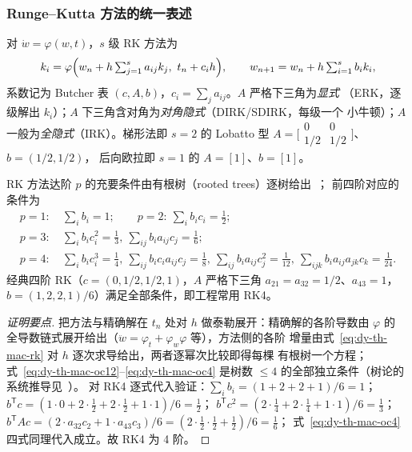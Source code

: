 \subsubsection{Runge--Kutta 方法的统一表述}

\begin{definition}\label{def:dy-th-mac-rk}
对 $\dot w=\varphi(w,t)$，$s$ 级 RK 方法为
\begin{equation}
k_i=\varphi\Bigl(w_n+h\textstyle\sum_{j=1}^{s}a_{ij}k_j,\ t_n+c_ih\Bigr),
\qquad
w_{n+1}=w_n+h\sum_{i=1}^{s}b_ik_i,
\label{eq:dy-th-mac-rk}
\end{equation}
系数记为 Butcher 表 $(c,A,b)$，$c_i=\sum_ja_{ij}$。$A$ 严格下三角为\emph{显式}
（ERK，逐级解出 $k_i$）；$A$ 下三角含对角为\emph{对角隐式}（DIRK/SDIRK，每级一个
小牛顿）；$A$ 一般为\emph{全隐式}（IRK）。梯形法即 $s=2$ 的 Lobatto 型
$A=\bigl[\begin{smallmatrix}0&0\\1/2&1/2\end{smallmatrix}\bigr]$、$b=(1/2,1/2)$，
后向欧拉即 $s=1$ 的 $A=[1]$、$b=[1]$。
\end{definition}

\begin{proposition}[阶条件（至 4 阶）]\label{prop:dy-th-mac-ordercond}
RK 方法达阶 $p$ 的充要条件由有根树（rooted trees）逐树给出~\cite{dym:butcher}；
前四阶对应的条件为
\begin{align}
p=1:&\ \textstyle\sum_ib_i=1;\qquad
p=2:\ \sum_ib_ic_i=\tfrac12;\label{eq:dy-th-mac-oc12}\\
p=3:&\ \textstyle\sum_ib_ic_i^2=\tfrac13,\ \sum_{ij}b_ia_{ij}c_j=\tfrac16;
\label{eq:dy-th-mac-oc3}\\
p=4:&\ \textstyle\sum_ib_ic_i^3=\tfrac14,\ \sum_{ij}b_ic_ia_{ij}c_j=\tfrac18,
\ \sum_{ij}b_ia_{ij}c_j^2=\tfrac1{12},\
\sum_{ijk}b_ia_{ij}a_{jk}c_k=\tfrac1{24}.
\label{eq:dy-th-mac-oc4}
\end{align}
经典四阶 RK（$c=(0,1/2,1/2,1)$，$A$ 严格下三角 $a_{21}=a_{32}=1/2$、$a_{43}=1$，
$b=(1,2,2,1)/6$）满足全部条件，即工程常用 RK4。
\end{proposition}

\begin{proof}[证明要点]
把方法与精确解在 $t_n$ 处对 $h$ 做泰勒展开：精确解的各阶导数由 $\varphi$ 的
全导数链式展开给出（$\ddot w=\varphi_t+\varphi_w\varphi$ 等），方法侧的各阶
增量由式~\eqref{eq:dy-th-mac-rk} 对 $h$ 逐次求导给出，两者逐幂次比较即得每棵
有根树一个方程；式~\eqref{eq:dy-th-mac-oc12}--\eqref{eq:dy-th-mac-oc4} 是树数
$\le4$ 的全部独立条件（树论的系统推导见~\cite{dym:butcher,dym:hairer1}）。
对 RK4 逐式代入验证：$\sum_ib_i=(1+2+2+1)/6=1$；
$b^{\mathsf T}c=(1\cdot0+2\cdot\tfrac12+2\cdot\tfrac12+1\cdot1)/6=\tfrac12$；
$b^{\mathsf T}c^2=(2\cdot\tfrac14+2\cdot\tfrac14+1\cdot1)/6=\tfrac13$；
$b^{\mathsf T}Ac=(2\cdot a_{32}c_2+1\cdot a_{43}c_3)/6
=(2\cdot\tfrac12\cdot\tfrac12+\tfrac12)/6=\tfrac16$；
式~\eqref{eq:dy-th-mac-oc4} 四式同理代入成立。故 RK4 为 4 阶。
\end{proof}

